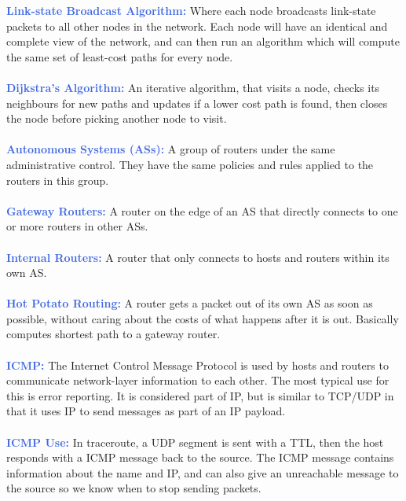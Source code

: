 \documentclass[]{article}
\begin{document}
\textcolor{RoyalBlue}{\textbf{Link-state Broadcast Algorithm:}} Where each node broadcasts link-state packets to all other nodes in the network. Each node will have an identical and complete view of the network, and can then run an algorithm which will compute the same set of least-cost paths for every node. \\\\ 
\textcolor{RoyalBlue}{\textbf{Dijkstra's Algorithm:}} An iterative algorithm, that visits a node, checks its neighbours for new paths and updates if a lower cost path is found, then closes the node before picking another node to visit. \\\\
\textcolor{RoyalBlue}{\textbf{Autonomous Systems (ASs):}} A group of routers under the same administrative control. They have the same policies and rules applied to the routers in this group.\\\\
\textcolor{RoyalBlue}{\textbf{Gateway Routers:}} A router on the edge of an AS that directly connects to one or more routers in other ASs. \\\\
\textcolor{RoyalBlue}{\textbf{Internal Routers:}} A router that only connects to hosts and routers within its own AS. \\\\
\textcolor{RoyalBlue}{\textbf{Hot Potato Routing:}} A router gets a packet out of its own AS as soon as possible, without caring about the costs of what happens after it is out. Basically computes shortest path to a gateway router. \\\\
\textcolor{RoyalBlue}{\textbf{ICMP:}} The Internet Control Message Protocol is used by hosts and routers to communicate network-layer information to each other. The most typical use for this is error reporting. It is considered part of IP, but is similar to TCP/UDP in that it uses IP to send messages as part of an IP payload. \\\\
\textcolor{RoyalBlue}{\textbf{ICMP Use:}} In traceroute, a UDP segment is sent with a TTL, then the host responds with a ICMP message back to the source. The ICMP message contains information about the name and IP, and can also give an unreachable message to the source so we know when to stop sending packets.
\end{document}
